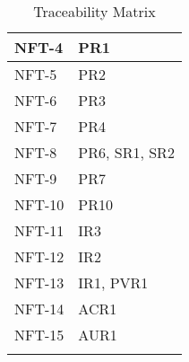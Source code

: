 \documentclass[12pt, titlepage]{article}
\begin{document}
\begin{longtable}{| p{} | p{} |}
    \hline
    NFT-4 & PR1\\
    \hline
    NFT-5 & PR2\\
    \hline
    NFT-6 & PR3\\
    \hline
    NFT-7 & PR4\\
    \hline
    NFT-8 & PR6, SR1, SR2\\
    \hline
    NFT-9 & PR7\\
    \hline
    NFT-10 & PR10\\
    \hline
    NFT-11 & IR3\\
    \hline
    NFT-12 & IR2\\
    \hline
    NFT-13 & IR1, PVR1\\
    \hline
    NFT-14 & ACR1\\
    \hline
    NFT-15 & AUR1\\
    \hline
\caption{Traceability Matrix}
\end{longtable}






\end{document}
